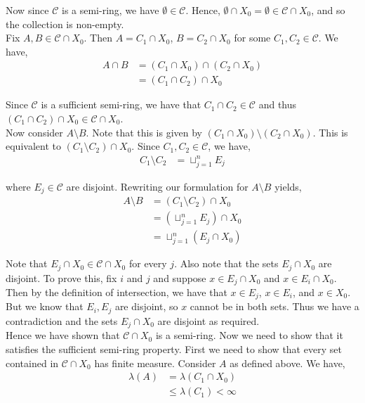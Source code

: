 \documentclass[12pt]{article}
\begin{document}
Now since $\mathcal{C}$ is a semi-ring, we have $\emptyset \in \mathcal{C}$. Hence, $\emptyset \cap X_0 = \emptyset \in \mathcal{C} \cap X_0$, and so the collection is non-empty.\\

Fix $A, B \in \mathcal{C} \cap X_0$. Then $A = C_1 \cap X_0$, $B = C_2 \cap X_0$ for some $C_1, C_2 \in \mathcal{C}$. We have,
\begin{align*}
A \cap B &= (C_1 \cap X_0) \cap (C_2 \cap X_0)\\
&= (C_1 \cap C_2) \cap X_0
\end{align*}

Since $\mathcal{C}$ is a sufficient semi-ring, we have that $C_1 \cap C_2 \in \mathcal{C}$ and thus $(C_1 \cap C_2) \cap X_0 \in \mathcal{C} \cap X_0$.\\

Now consider $A \setminus B$. Note that this is given by $(C_1 \cap X_0) \setminus (C_2 \cap X_0)$. This is equivalent to $(C_1 \setminus C_2) \cap X_0$. Since $C_1, C_2 \in \mathcal{C}$, we have,
\begin{align*}
C_1 \setminus C_2 &= \sqcup_{j=1}^n E_j
\end{align*}

where $E_j \in \mathcal{C}$ are disjoint. Rewriting our formulation for $A \setminus B$ yields,
\begin{align*}
A \setminus B &= (C_1 \setminus C_2) \cap X_0\\
&= (\sqcup_{j=1}^n E_j) \cap X_0\\
&= \sqcup_{j=1}^n (E_j \cap X_0)
\end{align*}

Note that $E_j \cap X_0 \in \mathcal{C} \cap X_0$ for every $j$. Also note that the sets $E_j \cap X_0$ are disjoint. To prove this, fix $i$ and $j$ and suppose $x \in E_j \cap X_0$ and $x \in E_i \cap X_0$. Then by the definition of intersection, we have that $x \in E_j$, $x \in E_i$, and $x \in X_0$. But we know that $E_i, E_j$ are disjoint, so $x$ cannot be in both sets. Thus we have a contradiction and the sets $E_j \cap X_0$ are disjoint as required.\\

Hence we have shown that $\mathcal{C} \cap X_0$ is a semi-ring. Now we need to show that it satisfies the sufficient semi-ring property. First we need to show that every set contained in $\mathcal{C} \cap X_0$ has finite measure. Consider $A$ as defined above. We have,
\begin{align*}
\lambda(A) &= \lambda(C_1 \cap X_0)\\
&\leq \lambda(C_1) < \infty
\end{align*}
\end{document}
